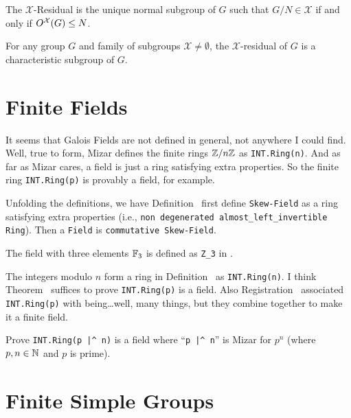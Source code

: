 \begin{theorem}
The $\mathcal{X}$-Residual is the unique normal subgroup of $G$ such
that $G/N\in\mathcal{X}$ if and only if $O^{\mathcal{X}}(G)\leq N$.
\end{theorem}

\begin{theorem}
For any group $G$ and family of subgroups $\mathcal{X}\neq\emptyset$,
the $\mathcal{X}$-residual of $G$ is a characteristic subgroup of $G$.
\end{theorem}

\section{Finite Fields}

It seems that Galois Fields are not defined in
general, not anywhere I could find. Well, true to form, Mizar defines
the finite rings $\ZZ/n\ZZ$ as \lstinline{INT.Ring(n)}. And as far as
Mizar cares, a field is just a ring satisfying extra properties. So the
finite ring \lstinline{INT.Ring(p)} is provably a field, for example.

Unfolding the definitions, we have Definition~
first define \lstinline{Skew-Field} as a ring satisfying extra properties
(i.e., \lstinline{non degenerated almost_left_invertible Ring}).
Then a \lstinline{Field} is \lstinline{commutative Skew-Field}.

\begin{example}[{$\FF_{3}$}]
The field with three elements $\FF_{3}$ is defined as \lstinline!Z_3!
in .
\end{example}

\begin{example}[{$\ZZ/n\ZZ$}]
The integers modulo $n$ form a ring in Definition~ as
\lstinline{INT.Ring(n)}. I think Theorem~ suffices to
prove \lstinline{INT.Ring(p)} is a field. Also Registration~
associated \lstinline{INT.Ring(p)} with being\dots well, many things,
but they combine together to make it a finite field.
\end{example}

\begin{exercise}
Prove \lstinline{INT.Ring(p |^ n)} is a field where ``\lstinline{p |^ n}''
is Mizar for $p^{n}$ (where $p,n\in\mathbb{N}$ and $p$ is prime).
\end{exercise}

\section{Finite Simple Groups}


